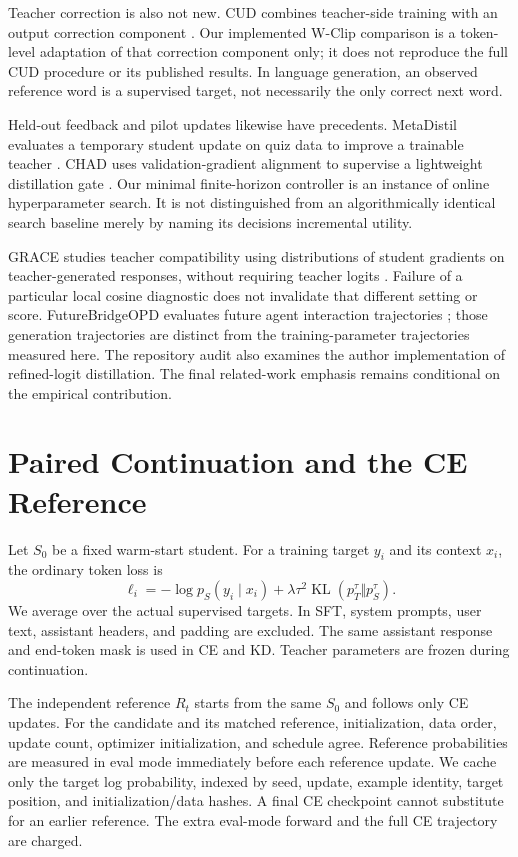 \documentclass[11pt]{article}
\begin{document}
Teacher correction is also not new. CUD combines teacher-side training
with an output correction component \citep{kim-etal-2026-trust}. Our
implemented W-Clip comparison is a token-level adaptation of that correction
component only; it does not reproduce the full CUD procedure or its published
results. In language generation, an observed reference word is a supervised
target, not necessarily the only correct next word.

Held-out feedback and pilot updates likewise have precedents.
MetaDistil evaluates a temporary student update on quiz data to improve a
trainable teacher \citep{zhou-etal-2022-bert}. CHAD uses validation-gradient
alignment to supervise a lightweight distillation gate
\citep{sumit-etal-2026-knowledge}. Our minimal finite-horizon controller is
an instance of online hyperparameter search. It is not distinguished from
an algorithmically identical search baseline merely by naming its decisions
incremental utility.

GRACE studies teacher compatibility using distributions of student gradients
on teacher-generated responses, without requiring teacher logits
\citep{panigrahi2025goodgracesprincipledteacher}. Failure of a particular
local cosine diagnostic does not invalidate that different setting or score.
FutureBridgeOPD evaluates future agent interaction trajectories
\citep{chen2026lookaheaddistillfuture}; those generation trajectories are
distinct from the training-parameter trajectories measured here. The
repository audit also examines the author implementation of refined-logit
distillation. The final related-work emphasis remains conditional on the
empirical contribution.

\section{Paired Continuation and the CE Reference}
Let $S_0$ be a fixed warm-start student. For a training target $y_i$ and its
context $x_i$, the ordinary token loss is
\begin{equation}
 \ell_i= -\log p_S(y_i\mid x_i)
 +\lambda\tau^2\operatorname{KL}(p_T^\tau\Vert p_S^\tau).
\end{equation}
We average over the actual supervised targets. In SFT, system prompts,
user text, assistant headers, and padding are excluded. The same assistant
response and end-token mask is used in CE and KD. Teacher parameters are
frozen during continuation.

The independent reference $R_t$ starts from the same $S_0$ and follows only
CE updates. For the candidate and its matched reference, initialization,
data order, update count, optimizer initialization, and schedule agree.
Reference probabilities are measured in eval mode immediately before each
reference update. We cache only the target log probability, indexed by
seed, update, example identity, target position, and initialization/data
hashes. A final CE checkpoint cannot substitute for an earlier reference.
The extra eval-mode forward and the full CE trajectory are charged.
\end{document}
